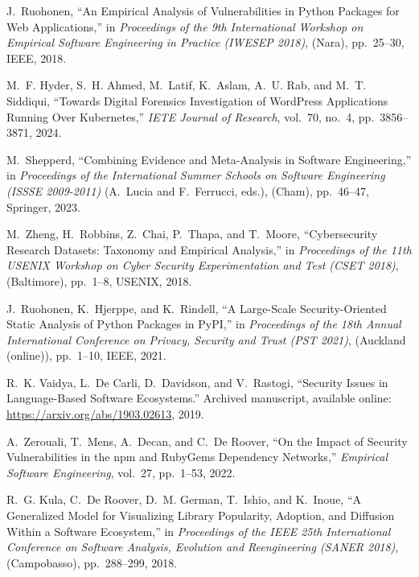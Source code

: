 \documentclass[5p, twocolumn, numbers, sort]{elsarticle}
\begin{document}
\begin{thebibliography}{10}
J.~Ruohonen, ``{A}n {E}mpirical {A}nalysis of {V}ulnerabilities in {P}ython
  {P}ackages for {W}eb {A}pplications,'' in {\em Proceedings of the 9th
  International Workshop on Empirical Software Engineering in Practice (IWESEP
  2018)}, (Nara), pp.~25--30, IEEE, 2018.

M.~F. Hyder, S.~H. Ahmed, M.~Latif, K.~Aslam, A.~U. Rab, and M.~T. Siddiqui,
  ``{T}owards {D}igital {F}orensics {I}nvestigation of {W}ord{P}ress
  {A}pplications {R}unning {O}ver {K}ubernetes,'' {\em IETE Journal of
  Research}, vol.~70, no.~4, pp.~3856--3871, 2024.

M.~Shepperd, ``{C}ombining {E}vidence and {M}eta-{A}nalysis in {S}oftware
  {E}ngineering,'' in {\em Proceedings of the International Summer Schools on
  Software Engineering (ISSSE 2009-2011)} (A.~Lucia and F.~Ferrucci, eds.),
  (Cham), pp.~46--47, Springer, 2023.

M.~Zheng, H.~Robbins, Z.~Chai, P.~Thapa, and T.~Moore, ``{C}ybersecurity
  {R}esearch {D}atasets: {T}axonomy and {E}mpirical {A}nalysis,'' in {\em
  Proceedings of the 11th USENIX Workshop on Cyber Security Experimentation and
  Test (CSET 2018)}, (Baltimore), pp.~1--8, USENIX, 2018.

J.~Ruohonen, K.~Hjerppe, and K.~Rindell, ``{A} {L}arge-{S}cale
  {S}ecurity-{O}riented {S}tatic {A}nalysis of {P}ython {P}ackages in {PyPI},''
  in {\em Proceedings of the 18th Annual International Conference on Privacy,
  Security and Trust (PST 2021)}, (Auckland (online)), pp.~1--10, IEEE, 2021.

R.~K. Vaidya, L.~{De Carli}, D.~Davidson, and V.~Rastogi, ``{S}ecurity {I}ssues
  in {L}anguage-{B}ased {S}oftware {E}cosystems.'' {A}rchived manuscript,
  available online: \url{https://arxiv.org/abs/1903.02613}, 2019.

A.~Zerouali, T.~Mens, A.~Decan, and C.~{De Roover}, ``{O}n the {I}mpact of
  {S}ecurity {V}ulnerabilities in the npm and {R}uby{G}ems {D}ependency
  {N}etworks,'' {\em Empirical Software Engineering}, vol.~27, pp.~1--53, 2022.

R.~G. Kula, C.~{De Roover}, D.~M. German, T.~Ishio, and K.~Inoue, ``{A}
  {G}eneralized {M}odel for {V}isualizing {L}ibrary {P}opularity, {A}doption,
  and {D}iffusion {W}ithin a {S}oftware {E}cosystem,'' in {\em Proceedings of
  the IEEE 25th International Conference on Software Analysis, Evolution and
  Reengineering (SANER 2018)}, (Campobasso), pp.~288--299, 2018.


\end{thebibliography}
\end{document}
